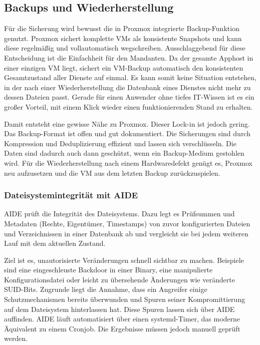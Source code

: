 \subsection{Backups und Wiederherstellung}

Für die Sicherung wird bewusst die in Proxmox integrierte Backup-Funktion
genutzt. Proxmox sichert komplette \acp{VM} als konsistente Snapshots und
kann diese regelmäßig und vollautomatisch wegschreiben. Ausschlaggebend für
diese Entscheidung ist die Einfachheit für den Mandanten. Da der gesamte
Apphost in einer einzigen \ac{VM} liegt, sichert ein \ac{VM}-Backup
automatisch den konsistenten Gesamtzustand aller Dienste auf einmal. Es kann
somit keine Situation entstehen, in der nach einer Wiederherstellung die
Datenbank eines Dienstes nicht mehr zu dessen Dateien passt. Gerade für einen
Anwender ohne tiefes \ac{IT}-Wissen ist es ein großer Vorteil, mit einem
Klick wieder einen funktionierenden Stand zu erhalten.

Damit entsteht eine gewisse Nähe zu Proxmox. Dieser Lock-in ist jedoch
gering. Das Backup-Format ist offen und gut dokumentiert. Die Sicherungen
sind durch Kompression und Deduplizierung effizient und lassen sich
verschlüsseln. Die Daten sind dadurch auch dann geschützt, wenn ein
Backup-Medium gestohlen wird. Für die Wiederherstellung nach einem
Hardwaredefekt genügt es, Proxmox neu aufzusetzen und die \ac{VM} aus dem
letzten Backup zurückzuspielen.

\subsubsection{Dateisystemintegrität mit \acs{AIDE}}
\ac{AIDE} prüft die Integrität des
Dateisystems. Dazu legt es Prüfsummen und Metadaten (Rechte, Eigentümer,
Timestamps) von zuvor konfigurierten Dateien und Verzeichnissen in einer
Datenbank ab und vergleicht sie bei jedem weiteren Lauf mit dem aktuellen
Zustand.

Ziel ist es, unautorisierte Veränderungen schnell sichtbar zu machen.
Beispiele sind eine eingeschleuste Backdoor in einer Binary, eine
manipulierte Konfigurationsdatei oder leicht zu übersehende Änderungen wie
veränderte \ac{SUID}-Bits. Zugrunde liegt die Annahme, dass ein Angreifer
einige Schutzmechanismen bereits überwunden und Spuren seiner
Kompromittierung auf dem Dateisystem hinterlassen hat. Diese Spuren lassen
sich über \ac{AIDE} auffinden.
\ac{AIDE} läuft automatisiert über einen systemd-Timer, das moderne
Äquivalent zu einem Cronjob. Die Ergebnisse müssen jedoch manuell geprüft
werden.

